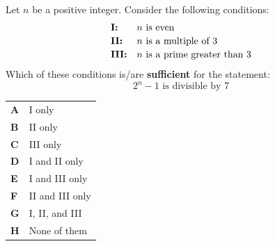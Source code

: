\documentclass[11pt,a4paper]{article}
\begin{document}
\begin{enumerate}[label=\textbf{\arabic*.},leftmargin=*,itemsep=0pt,start=16]
\questionitem[Number]
Let $n$ be a positive integer. Consider the following conditions: \[ \begin{array}{@{}l l@{}}
\textbf{I:} & \text{$n$ is even} \\[2pt]
\textbf{II:} & \text{$n$ is a multiple of $3$} \\[2pt]
\textbf{III:} & \text{$n$ is a prime greater than $3$}
\end{array} \] Which of these conditions is/are \textbf{sufficient} for the statement: \[2^n-1 \text{ is divisible by }7\]

\par\vspace*{12pt}
\begin{tabularx}{\linewidth}{@{}>{\bfseries}l Y@{}}
A &
I only
\\[0.8em]
B &
II only
\\[0.8em]
C &
III only
\\[0.8em]
D &
I and II only
\\[0.8em]
E &
I and III only
\\[0.8em]
F &
II and III only
\\[0.8em]
G &
I, II, and III
\\[0.8em]
H &
None of them
\\
\end{tabularx}
\end{enumerate}
\clearpage
\thispagestyle{djspaper}
\vspace*{8pt}
\end{document}

